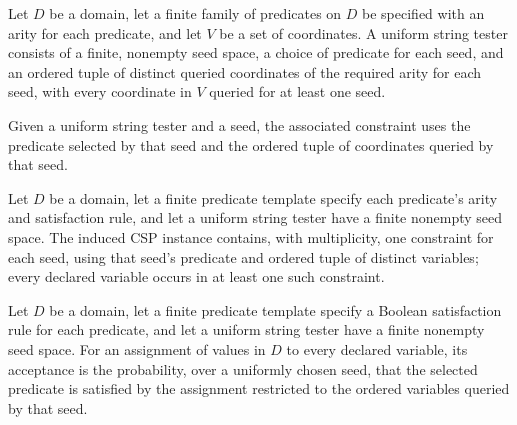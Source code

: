 \begin{definition}
\label{FABL.UniformStringTester}
\leanok
{}
Let $D$ be a domain, let a finite family of predicates on $D$ be specified with an arity
for each predicate, and let $V$ be a set of coordinates. A uniform string tester
consists of a finite, nonempty seed space, a choice of predicate for each seed, and an
ordered tuple of distinct queried coordinates of the required arity for each seed, with
every coordinate in $V$ queried for at least one seed.
\end{definition}

\begin{definition}
\label{FABL.UniformStringTester.constraint}
\leanok
{}
Given a uniform string tester and a seed, the associated constraint uses the predicate
selected by that seed and the ordered tuple of coordinates queried by that seed.
\end{definition}

\begin{definition}
\label{FABL.UniformStringTester.toCSPInstance}
\leanok
{}
Let $D$ be a domain, let a finite predicate template specify each predicate’s arity and
satisfaction rule, and let a uniform string tester have a finite nonempty seed space.
The induced CSP instance contains, with multiplicity, one constraint for each seed,
using that seed’s predicate and ordered tuple of distinct variables; every declared
variable occurs in at least one such constraint.
\end{definition}

\begin{definition}
\label{FABL.UniformStringTester.acceptance}
\leanok
{}
Let $D$ be a domain, let a finite predicate template specify a Boolean satisfaction rule
for each predicate, and let a uniform string tester have a finite nonempty seed space.
For an assignment of values in $D$ to every declared variable, its acceptance is the
probability, over a uniformly chosen seed, that the selected predicate is satisfied by
the assignment restricted to the ordered variables queried by that seed.
\end{definition}

